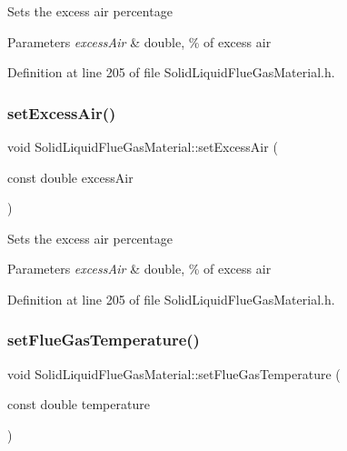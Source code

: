 Sets the excess air percentage 
\begin{DoxyParams}{Parameters}
{\em excess\+Air} & double, \% of excess air \\
\hline
\end{DoxyParams}


Definition at line 205 of file Solid\+Liquid\+Flue\+Gas\+Material.\+h.

\mbox{\label{class_solid_liquid_flue_gas_material_a7a3f9f77d267afc05f5fde1da9329ec5}} 
\subsubsection{\texorpdfstring{set\+Excess\+Air()}{setExcessAir()}\hspace{0.1cm}{\footnotesize\ttfamily [3/3]}}
{\footnotesize\ttfamily void Solid\+Liquid\+Flue\+Gas\+Material\+::set\+Excess\+Air (\begin{DoxyParamCaption}\item[{const double}]{excess\+Air }\end{DoxyParamCaption})\hspace{0.3cm}{\ttfamily [inline]}}

Sets the excess air percentage 
\begin{DoxyParams}{Parameters}
{\em excess\+Air} & double, \% of excess air \\
\hline
\end{DoxyParams}


Definition at line 205 of file Solid\+Liquid\+Flue\+Gas\+Material.\+h.

\mbox{\label{class_solid_liquid_flue_gas_material_ae647700dbff5ccea7938b2117f2c3156}} 
\subsubsection{\texorpdfstring{set\+Flue\+Gas\+Temperature()}{setFlueGasTemperature()}\hspace{0.1cm}{\footnotesize\ttfamily [1/3]}}
{\footnotesize\ttfamily void Solid\+Liquid\+Flue\+Gas\+Material\+::set\+Flue\+Gas\+Temperature (\begin{DoxyParamCaption}\item[{const double}]{temperature }\end{DoxyParamCaption})\hspace{0.3cm}{\ttfamily [inline]}}

